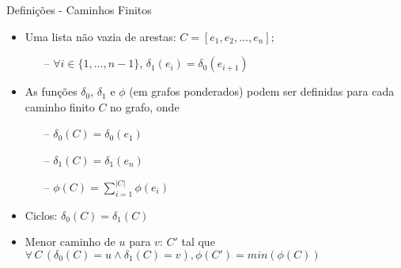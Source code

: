 \begin{frame}{Definições - Caminhos Finitos}
    \begin{itemize}
        \item Uma lista não vazia de arestas: $C = [e_1,e_2, ..., e_n]$;
        \begin{itemize}
            \item[--] $\forall i \in \{1, ..., n-1\}$, $\delta_1(e_i) = \delta_0(e_{i+1})$
        \end{itemize}
        \item As funções $\delta_0$, $\delta_1$ e $\phi$ (em grafos ponderados) podem ser definidas para cada caminho finito $C$ no grafo, onde
        \begin{itemize}
            \item[--] $\delta_0(C) = \delta_0(e_1)$
            \item[--] $\delta_1(C) = \delta_1(e_n)$
            \item[--] $\phi(C) = \sum_{i=1}^{|C|} \phi(e_i)$
        \end{itemize}
        \item Ciclos: $\delta_0(C) = \delta_1(C)$
        \item Menor caminho de $u$ para $v$: $C'$ tal que $\forall\,C\,(\delta_0(C) = u \land \delta_1(C) = v), \phi(C') = min(\phi(C))$
    \end{itemize}
\end{frame}